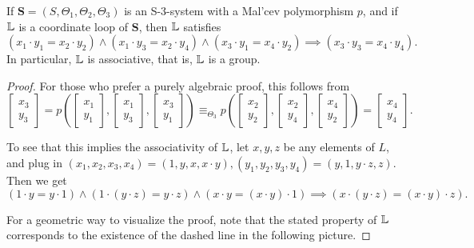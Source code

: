 \documentclass[letterpaper,11pt]{article}
\begin{document}
\begin{lem}\label{S3-loop-associative} If $\mathbf{S} = (S,\Theta_1,\Theta_2,\Theta_3)$ is an S-3-system with a Mal'cev polymorphism $p$, and if $\mathbb{L}$ is a coordinate loop of $\mathbf{S}$, then $\mathbb{L}$ satisfies
\[
(x_1\cdot y_1 = x_2\cdot y_2) \wedge (x_1\cdot y_3 = x_2\cdot y_4) \wedge (x_3\cdot y_1 = x_4\cdot y_2) \implies (x_3\cdot y_3 = x_4 \cdot y_4).
\]
In particular, $\mathbb{L}$ is associative, that is, $\mathbb{L}$ is a group.
\end{lem}
\begin{proof} For those who prefer a purely algebraic proof, this follows from
\[
\begin{bmatrix} x_3\\ y_3\end{bmatrix} = p\left(\begin{bmatrix} x_1\\ y_1\end{bmatrix}, \begin{bmatrix} x_1\\ y_3\end{bmatrix}, \begin{bmatrix} x_3\\ y_1\end{bmatrix}\right) \equiv_{\Theta_3} p\left(\begin{bmatrix} x_2\\ y_2\end{bmatrix}, \begin{bmatrix} x_2\\ y_4\end{bmatrix}, \begin{bmatrix} x_4\\ y_2\end{bmatrix}\right) = \begin{bmatrix} x_4\\ y_4\end{bmatrix}.
\]

To see that this implies the associativity of $\mathbb{L}$, let $x,y,z$ be any elements of $L$, and plug in $(x_1,x_2,x_3,x_4) = (1, y, x, x\cdot y), (y_1,y_2,y_3,y_4) = (y, 1, y\cdot z, z)$. Then we get
\[
(1\cdot y = y\cdot 1) \wedge (1\cdot (y\cdot z) = y\cdot z) \wedge (x\cdot y = (x\cdot y)\cdot 1) \implies (x\cdot (y\cdot z) = (x\cdot y) \cdot z).
\]

For a geometric way to visualize the proof, note that the stated property of $\mathbb{L}$ corresponds to the existence of the dashed line in the following picture.


\end{proof}
\end{document}
